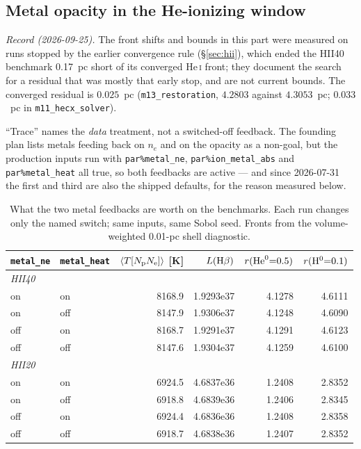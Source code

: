 \documentclass[english,a4paper]{my_memo}
\newcommand{\code}[1]{\texttt{#1}}
\begin{document}
\subsection{Metal opacity in the He-ionizing window}
\label{sec:metalop}
\emph{Record (2026-09-25).}  The front shifts and bounds in this part were
measured on runs stopped by the earlier convergence rule (\S\ref{sec:hii}),
which ended the HII40 benchmark 0.17~pc short of its converged He\,\textsc{i}
front; they document the search for a residual that was mostly that early
stop, and are not current bounds.  The converged residual is $0.025$~pc
(\code{m13\_restoration}, $4.2803$ against $4.3053$~pc; $0.033$~pc in
\code{m11\_hecx\_solver}).

``Trace'' names the \emph{data} treatment, not a switched-off feedback.  The
founding plan lists metals feeding back on $n_e$ and on the opacity as a
non-goal, but the production inputs run with \code{par\%metal\_ne},
\code{par\%ion\_metal\_abs} and \code{par\%metal\_heat} all true, so both
feedbacks are active --- and since 2026-07-31 the first and third are also the
shipped defaults, for the reason measured below.

\begin{table}[htb]
\centering
\caption{What the two metal feedbacks are worth on the benchmarks.  Each run
changes only the named switch; same inputs, same Sobol seed.  Fronts from the
volume-weighted 0.01-pc shell diagnostic.}
\label{tab:metalsw}
\small
\begin{tabular}{llrrrr}
\hline
\code{metal\_ne} & \code{metal\_heat} & $\langle T[N_{\rm p}N_{\rm e}]\rangle$ [K]
 & $L({\rm H}\beta)$ & $r({\rm He}^0{=}0.5)$ & $r({\rm H}^0{=}0.1)$ \\
\hline
\multicolumn{6}{l}{\emph{HII40}}\\
on  & on  & 8168.9 & 1.9293e37 & 4.1278 & 4.6111 \\
on  & off & 8147.9 & 1.9306e37 & 4.1248 & 4.6090 \\
off & on  & 8168.7 & 1.9291e37 & 4.1291 & 4.6123 \\
off & off & 8147.6 & 1.9304e37 & 4.1259 & 4.6100 \\
\multicolumn{6}{l}{\emph{HII20}}\\
on  & on  & 6924.5 & 4.6837e36 & 1.2408 & 2.8352 \\
on  & off & 6918.8 & 4.6839e36 & 1.2406 & 2.8345 \\
off & on  & 6924.4 & 4.6836e36 & 1.2408 & 2.8358 \\
off & off & 6918.7 & 4.6838e36 & 1.2407 & 2.8352 \\
\hline
\end{tabular}
\end{table}
\end{document}
